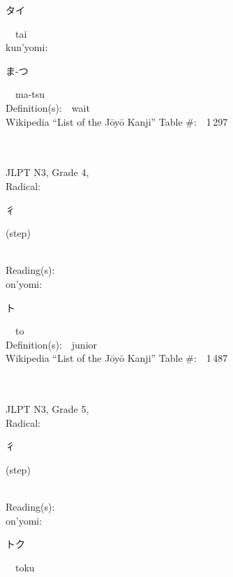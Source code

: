\begin{multicols}{2}
{\hspace*{2em}}{\begin{CJK}{UTF8}{min} タイ \end{CJK}}\ \ tai\ \ \\
{\hspace*{1em}}kun'yomi:\ \ \\
{\hspace*{2em}}{\begin{CJK}{UTF8}{min} ま-つ \end{CJK}}\ \ ma-tsu\ \ \\
Definition(s):\ \ wait \\
Wikipedia ``List of the J\=oy\=o Kanji'' Table \#:\ \ 1\,297 \\
\ \ \\
{\fontsize{34pt}{40pt}  }\ \ \\  %
{JLPT N3, Grade 4, \\Radical:\ \ {\begin{CJK}{UTF8}{min} 彳 \end{CJK}} (step) } \\
Reading(s):\ \ \\
{\hspace*{1em}}on'yomi:\ \ \\
{\hspace*{2em}}{\begin{CJK}{UTF8}{min} ト \end{CJK}}\ \ to\ \ \\
Definition(s):\ \ junior \\
Wikipedia ``List of the J\=oy\=o Kanji'' Table \#:\ \ 1\,487 \\
\ \ \\
{\fontsize{34pt}{40pt}  }\ \ \\  %
{JLPT N3, Grade 5, \\Radical:\ \ {\begin{CJK}{UTF8}{min} 彳 \end{CJK}} (step) } \\
Reading(s):\ \ \\
{\hspace*{1em}}on'yomi:\ \ \\
{\hspace*{2em}}{\begin{CJK}{UTF8}{min} トク \end{CJK}}\ \ toku\ \ \\

\end{multicols}
